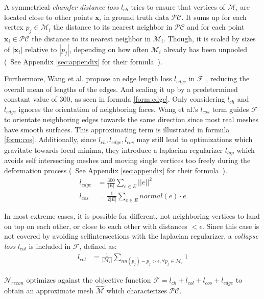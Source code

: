    A symmetrical \emph{chamfer distance loss} $l_{ch}$ tries to ensure that vertices of $\mathcal{M}_{i}$ 
   are located close to other points $\textbf{x}_i$ in ground truth data $\mathcal{PC}$. It sums
   up for each vertex $p_j\in \mathcal{M}_i$ the distance to its nearest neighbor in $\mathcal{PC}$
   and for each point $\textbf{x}_i\in \mathcal{PC}$ the distance to its nearest neighbor in
   $\mathcal{M}_i$. Though, it is scaled by sizes of $|\textbf{x}_i|$ relative to $|p_j|$, depending on how often 
   $\mathcal{M}_i$ already has been unpooled (~See Appendix \ref{sec:appendix} for their formula~).

   Furthermore, Wang et al. propose an edge length loss $l_{edge}$ in $\mathcal{F}$ , reducing the overall mean of lengths of the edges.
   And scaling it up by a predetermined constant value of $300$, as seen in formula \ref{form:edge}. 
   Only considering $l_{ch}$ and $l_{edge}$ ignores the orientation of neighboring faces.
   Wang et al.'s $l_{cos}$ term guides $\mathcal{F}$ to orientate neighboring edges towards the 
   same direction since most real meshes have smooth surfaces. This approximating term is illustrated in formula \ref{form:cos}.
   Additionally, since $l_{ch},l_{edge},l_{cos}$ may still lead to optimizations which gravitate towards local minima, they introduce 
   a laplacian regularizer $l_{lap}$ which avoids self intersecting meshes and moving single vertices too freely during
    the deformation process (~See Appendix \ref{sec:appendix} for their formula~).
   \begin{align}
      \label{form:edge}
      l_{edge} &= \frac{300}{|E|}\sum_{e\in E}||e||^2\\
      \label{form:cos}
      l_{cos} &= \frac{1}{2|E|}\sum_{e\in E}normal(e) \cdot e
   \end{align}


   In most extreme cases, it is possible for different, not neighboring vertices to land on top on each other, or close to each other 
   with distances $< \epsilon$. Since this case is not covered by avoiding selfintersections with the laplacian regularizer, a 
   \emph{collapse loss} $l_{col}$ is included in $\mathcal{F}$, defined as:
   \begin{align}
      l_{col} &= \frac{1}{|\mathcal{M}_{i}|}\sum_{ nn(p_j)-p_j > \epsilon,\forall p_j \in \mathcal{M}_{i}} 1
   \end{align}

   $\mathcal{N}_{recon}$ optimizes against the objective function $\mathcal{F}=l_{ch}+l_{col}+l_{cos}+l_{edge}$
    to obtain an approximate mesh $\hat{\mathcal{M}}$ which characterizes $\mathcal{PC}$.

